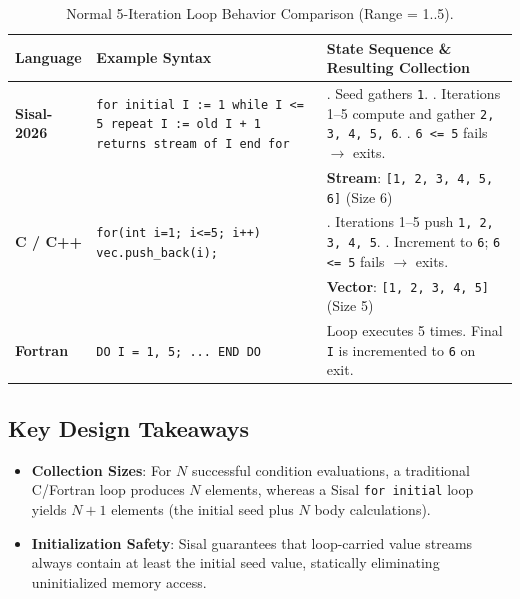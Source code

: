 \begin{table}[h!]
\centering
\small
\begin{tabularx}{\textwidth}{l >{\raggedright\arraybackslash}p{4.2cm} >{\raggedright\arraybackslash}X}
\toprule
\textbf{Language} & \textbf{Example Syntax} & \textbf{State Sequence \& Resulting Collection} \\
\midrule
\textbf{Sisal-2026} & \texttt{for initial I := 1 while I <= 5 repeat I := old I + 1 returns stream of I end for} & 1. Seed gathers \texttt{1}. \newline 2. Iterations 1--5 compute and gather \texttt{2, 3, 4, 5, 6}. \newline 3. \texttt{6 <= 5} fails $\rightarrow$ exits. \\
\addlinespace
& & \textbf{Stream}: \texttt{[1, 2, 3, 4, 5, 6]} (Size 6) \\
\midrule
\textbf{C / C++} & \texttt{for(int i=1; i<=5; i++) vec.push\_back(i);} & 1. Iterations 1--5 push \texttt{1, 2, 3, 4, 5}. \newline 2. Increment to \texttt{6}; \texttt{6 <= 5} fails $\rightarrow$ exits. \\
\addlinespace
& & \textbf{Vector}: \texttt{[1, 2, 3, 4, 5]} (Size 5) \\
\midrule
\textbf{Fortran} & \texttt{DO I = 1, 5; ... END DO} & Loop executes 5 times. Final \texttt{I} is incremented to \texttt{6} on exit. \\
\bottomrule
\end{tabularx}
\caption{Normal 5-Iteration Loop Behavior Comparison (Range = 1..5).}
\label{tab:loop_comparison_normal}
\end{table}

\subsection{Key Design Takeaways}
\begin{itemize}
    \item \textbf{Collection Sizes}: For $N$ successful condition evaluations, a traditional C/Fortran loop produces $N$ elements, whereas a Sisal \texttt{for initial} loop yields $N + 1$ elements (the initial seed plus $N$ body calculations).
    \item \textbf{Initialization Safety}: Sisal guarantees that loop-carried value streams always contain at least the initial seed value, statically eliminating uninitialized memory access.
\end{itemize}
